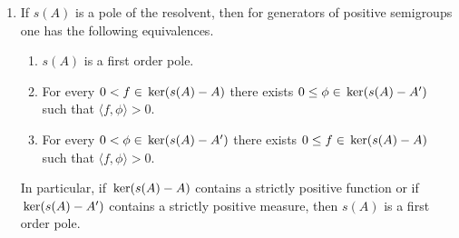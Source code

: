 \begin{remarks}\label{rem:b3-2.15}
%

	
	\begin{enumerate}[\upshape (i), wide, labelindent=.5em]
	\item
	If $s(A)$ is a pole of the resolvent, then for generators of positive semigroups one has the following equivalences.
	
	\begin{enumerate}[\upshape (a)]
		\item 
		$s(A)$ is a first order pole.
		
		\item 
		For every $0 < f \in \mathop{}\mathrm{ker}(s(A) - A)$ there exists $0 \leq \phi \in \mathop{}\mathrm{ker}(s(A) - A')$ such that $\langle f,\phi \rangle > 0$.
		
		\item 
		For every $0 < \phi \in \mathop{}\mathrm{ker}(s(A) - A')$ there exists $0 \leq f \in \mathop{}\mathrm{ker}(s(A) - A)$ such that $\langle f,\phi \rangle > 0$.
	\end{enumerate}
	In particular, if $\mathop{}\mathrm{ker}(s(A) - A)$ contains a strictly positive function or if $\mathop{}\mathrm{ker}(s(A) - A')$ contains a strictly positive measure, then $s(A)$ is a first order pole.


\end{enumerate}
\end{remarks}
